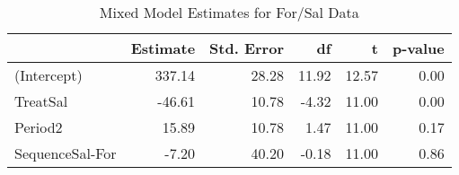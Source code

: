 \begin{table}

\caption{\label{tab:pefrDataEstimates}Mixed Model Estimates for For/Sal Data}
\centering
\begin{tabular}[t]{>{}l|rrrrr}
\toprule
 & Estimate & Std. Error & df & t & p-value\\
\midrule
(Intercept) & 337.14 & 28.28 & 11.92 & 12.57 & 0.00\\
TreatSal & -46.61 & 10.78 & -4.32 & 11.00 & 0.00\\
Period2 & 15.89 & 10.78 & 1.47 & 11.00 & 0.17\\
SequenceSal-For & -7.20 & 40.20 & -0.18 & 11.00 & 0.86\\
\bottomrule
\end{tabular}
\end{table}
